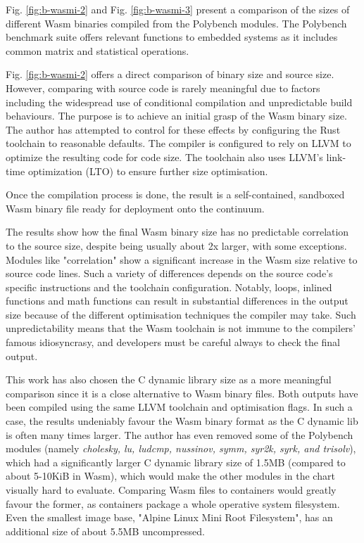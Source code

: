 Fig. \ref{fig:b-wasmi-2} and Fig. \ref{fig:b-wasmi-3} present a comparison of the sizes of different Wasm binaries compiled from the Polybench \cite{yuki2014understanding} modules. The Polybench benchmark suite offers relevant functions to embedded systems as it includes common matrix and statistical operations.

Fig. \ref{fig:b-wasmi-2} offers a direct comparison of binary size and source size. However, comparing with source code is rarely meaningful due to factors including the widespread use of conditional compilation and unpredictable build behaviours. The purpose is to achieve an initial grasp of the Wasm binary size. The author has attempted to control for these effects by configuring the Rust toolchain to reasonable defaults. The compiler is configured to rely on LLVM to optimize the resulting code for code size. The toolchain also uses LLVM's link-time optimization (LTO) to ensure further size optimisation.

Once the compilation process is done, the result is a self-contained, sandboxed Wasm binary file ready for deployment onto the continuum.

The results show how the final Wasm binary size has no predictable correlation to the source size, despite being usually about 2x larger, with some exceptions. Modules like "correlation" show a significant increase in the Wasm size relative to source code lines. Such a variety of differences depends on the source code's specific instructions and the toolchain configuration. Notably, loops, inlined functions and math functions can result in substantial differences in the output size because of the different optimisation techniques the compiler may take. Such unpredictability means that the Wasm toolchain is not immune to the compilers' famous idiosyncrasy, and developers must be careful always to check the final output.

This work has also chosen the C dynamic library size as a more meaningful comparison since it is a close alternative to Wasm binary files. Both outputs have been compiled using the same LLVM toolchain and optimisation flags. In such a case, the results undeniably favour the Wasm binary format as the C dynamic lib is often many times larger. The author has even removed some of the Polybench modules (namely \emph{cholesky, lu, ludcmp, nussinov, symm, syr2k, syrk, and trisolv}), which had a significantly larger C dynamic library size of 1.5MB (compared to about 5-10KiB in Wasm), which would make the other modules in the chart visually hard to evaluate. Comparing Wasm files to containers would greatly favour the former, as containers package a whole operative system filesystem. Even the smallest image base, "Alpine Linux Mini Root Filesystem", has an additional size of about 5.5MB uncompressed.


